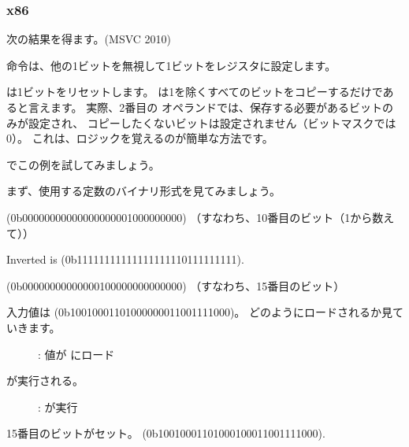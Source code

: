 ﻿\subsubsection{x86}


次の結果を得ます。(MSVC 2010)




\OR 命令は、他の1ビットを無視して1ビットをレジスタに設定します。


\AND は1ビットをリセットします。  \AND は1を除くすべてのビットをコピーするだけであると言えます。 
実際、2番目の \AND オペランドでは、保存する必要があるビットのみが設定され、
コピーしたくないビットは設定されません（ビットマスクでは0）。 
これは、ロジックを覚えるのが簡単な方法です。

\clearpage
\mysubparagraph{\olly}

\olly でこの例を試してみましょう。

まず、使用する定数のバイナリ形式を見てみましょう。

 (0b0000000000000000000{\color{red}1}000000000) （すなわち、10番目のビット（1から数えて））

Inverted  is  (0b1111111111111111111{\color{red}0}111111111).

 (0b00000000000000{\color{red}1}00000000000000) （すなわち、15番目のビット）

入力値は  (0b10010001101000000011001111000)。
どのようにロードされるか見ていきます。

\begin{figure}[H]
\centering
{}
\caption{\olly: 値が \ECX にロード}
\label{fig:set_reset_olly1}
\end{figure}

\clearpage
\OR が実行される。

\begin{figure}[H]
\centering
{}
\caption{\olly: \OR が実行}
\label{fig:set_reset_olly2}
\end{figure}

15番目のビットがセット。  
(0b10010001101000{\color{red}1}00011001111000).

